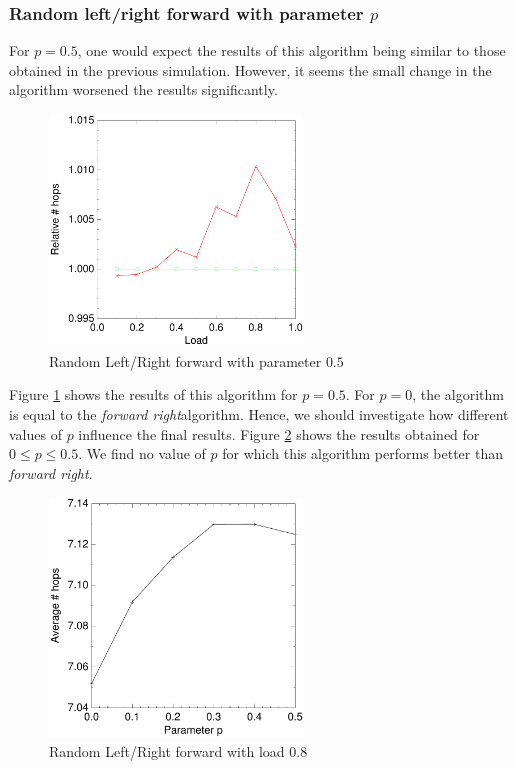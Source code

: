 \documentclass[10pt,a4paper]{article}
\newcommand{\FR}{\textit{forward right\xspace}}
\begin{document}
\subsubsection*{Random left/right forward with parameter $p$}
For $p=0.5$, one would expect the results of this algorithm being similar to those obtained in the previous simulation. However, it seems the small change in the algorithm worsened the results significantly.

\begin{figure}[h!tb]
\centering
\includegraphics[width=0.6\textwidth]{data/randswitchright.pdf}
\caption{Random Left/Right forward with parameter $0.5$}
\label{figrandswitch}
\end{figure}

Figure \ref{figrandswitch} shows the results of this algorithm for $p=0.5$. For $p=0$, the algorithm is equal to the \FR algorithm. Hence, we should investigate how different values of $p$ influence the final results. Figure \ref{figrandswitchp} shows the results obtained for $0 \leq p \leq 0.5$. We find no value of $p$ for which this algorithm performs better than \FR.

\begin{figure}[h!tb]
\centering
\includegraphics[width=0.6\textwidth]{data/randswitchp.pdf}
\caption{Random Left/Right forward with load $0.8$}
\label{figrandswitchp}
\end{figure}
\end{document}
